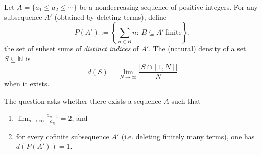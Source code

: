 Let $A=\{a_1\le a_2\le\cdots\}$ be a nondecreasing sequence of positive integers.
For any subsequence $A'$ (obtained by deleting terms), define
\[
P(A'):=\left\{\sum_{n\in B} n:\ B\subseteq A'\ \text{finite}\right\},
\]
the set of subset sums of \emph{distinct indices} of $A'$.
The (natural) density of a set $S\subseteq\mathbb{N}$ is
\[
 d(S)=\lim_{N\to\infty}\frac{|S\cap[1,N]|}{N}
\]
when it exists.

The question asks whether there exists a sequence $A$ such that
\begin{enumerate}
\item $\displaystyle \lim_{n\to\infty}\frac{a_{n+1}}{a_n}=2$, and
\item for every cofinite subsequence $A'$ (i.e. deleting finitely many terms), one has $d(P(A'))=1$.
\end{enumerate}
